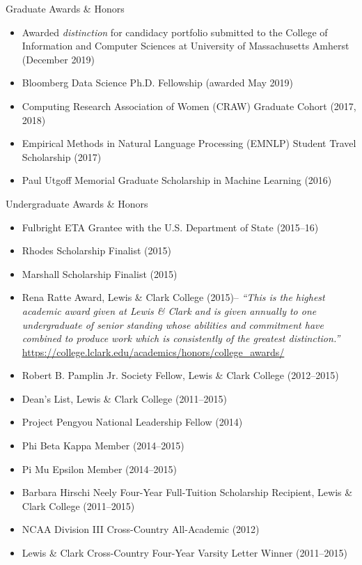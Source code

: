 \documentclass{resume} %
\begin{document}
\begin{rSection}{Graduate Awards \& Honors}
\begin{itemize}
\item Awarded \emph{distinction} for candidacy portfolio submitted to the College of Information and Computer Sciences at University of Massachusetts Amherst (December 2019) 
\item Bloomberg Data Science Ph.D. Fellowship (awarded May 2019)  
\item Computing Research Association of Women (CRAW) Graduate Cohort (2017, 2018) 
\item Empirical Methods in Natural Language Processing (EMNLP) Student Travel Scholarship (2017)
\item Paul Utgoff Memorial Graduate Scholarship in Machine Learning (2016) 
\end{itemize} 
\end{rSection}

\begin{rSection}{Undergraduate Awards \& Honors}
\begin{itemize}
\item Fulbright ETA Grantee with the U.S. Department of State (2015--16)
\item Rhodes Scholarship Finalist (2015) 
\item Marshall Scholarship Finalist (2015) 
\item Rena Ratte Award, Lewis \& Clark College (2015)-- \emph{``This is the highest academic award given at Lewis \& Clark and is given annually to one undergraduate of senior standing whose abilities and commitment have combined to produce work which is consistently of the greatest distinction.''} \url{https://college.lclark.edu/academics/honors/college_awards/}
\item Robert B. Pamplin Jr. Society Fellow, Lewis \& Clark College (2012--2015)
\item Dean's List, Lewis \& Clark College (2011--2015)
\item Project Pengyou National Leadership Fellow (2014) 
\item Phi Beta Kappa Member (2014--2015)
\item Pi Mu Epsilon Member (2014--2015)
\item Barbara Hirschi Neely Four-Year Full-Tuition Scholarship Recipient, Lewis \& Clark College (2011--2015)
\item NCAA Division III Cross-Country All-Academic (2012) 
\item Lewis \& Clark Cross-Country Four-Year Varsity Letter Winner (2011--2015)
\end{itemize} 
\end{rSection}
\end{document}
